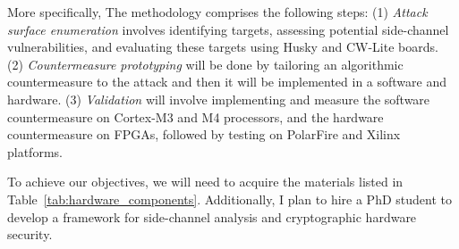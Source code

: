More specifically, The methodology comprises the following steps:
(1) \textit{Attack surface enumeration} involves identifying targets, assessing potential 
side-channel vulnerabilities, and evaluating these targets 
using Husky and CW-Lite boards.
(2) \textit{Countermeasure prototyping} will be done by tailoring an algorithmic countermeasure to the 
attack and then it will be implemented in a software and hardware. 
(3) \textit{Validation} will involve implementing and measure the software countermeasure on 
Cortex-M3 and M4 processors, and the hardware countermeasure on FPGAs, 
followed by testing on PolarFire and Xilinx platforms.

To achieve our objectives, we will need to acquire the materials 
listed in Table~\ref{tab:hardware_components}. Additionally, I 
plan to hire a PhD student to develop a framework for side-channel 
analysis and cryptographic hardware security.

